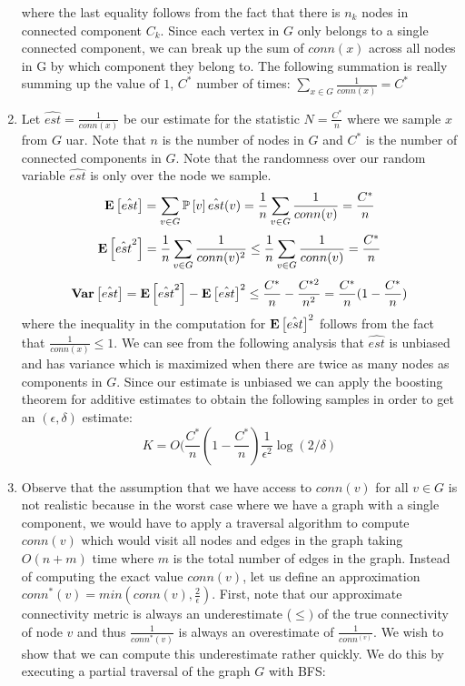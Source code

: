 \documentclass[12pt]{article}
\begin{document}
\begin{solution}
\begin{enumerate}[label=(\alph*)]
    where the last equality follows from the fact that there is $n_k$ nodes in connected component $C_k$. Since each vertex in $G$ only belongs to a single connected component, we can break up the sum of $conn(x)$ across all nodes in G by which component they belong to. The following summation is really summing up the value of $1$, $C^*$ number of times: $\sum_{x\in G}{\frac{1}{conn(x)}} = C^*$
    \item Let $\hat{est} = \frac{1}{conn(x)}$ be our estimate for the statistic $N = \frac{C^*}{n}$ where we sample $x$ from $G$ 
    uar. Note that $n$ is the number of nodes in $G$ and $C^*$ is the number of connected components in $G$. Note that the randomness over our random variable $\hat{est}$ is only over the node we sample. 
    \[
    \mathbf{E}\left[\hat{est}\right] = \sum_{v\in G}{\mathbb{P}\left[v\right]\hat{est}(v)} =  \frac{1}{n}\sum_{v\in G}{\frac{1}{conn(v)}} = \frac{C^*}{n}
    \]
    \[
    \mathbf{E}\left[\hat{est}^2\right] = \frac{1}{n}\sum_{v\in G}{\frac{1}{conn(v)^2}} \leq \frac{1}{n}\sum_{v\in G}{\frac{1}{conn(v)}} = \frac{C^*}{n}
    \]
    \[
    \mathbf{Var}\left[\hat{est}\right] = \mathbf{E}\left[\hat{est}^2\right] - \mathbf{E}\left[\hat{est}\right]^2 \leq \frac{C^*}{n} - \frac{C^{*2}}{n^2} = \frac{C^*}{n} (1 - \frac{C^*}{n})
    \]
    where the inequality in the computation for $\mathbf{E}\left[\hat{est}\right]^2$ follows from the fact that $\frac{1}{conn(x)} \leq 1$. We can see from the following analysis that $\hat{est}$ is unbiased and has variance which is maximized when there are twice as many nodes as components in $G$. Since our estimate is unbiased we can apply the boosting theorem for additive estimates to obtain the following samples in order to get an $(\epsilon,\delta)$ estimate:
    \[
    K = O(\frac{C^*}{n} (1 - \frac{C^*}{n}) \frac{1}{\epsilon^2} \log(2/\delta)
    \]
    \item Observe that the assumption that we have access to $conn(v)$ for all $v\in G$ is not realistic because in the worst case where we have a graph with a single component, we would have to apply a traversal algorithm to compute $conn(v)$ which would visit all nodes and edges in the graph taking $O(n + m)$ time where $m$ is the total number of edges in the graph. Instead of computing the exact value $conn(v)$, let us define an approximation $conn^*(v) = min(conn(v), \frac{2}{\epsilon})$. First, note that our approximate connectivity metric is always an underestimate ($\leq)$ of the true connectivity of node $v$ and thus $\frac{1}{conn^*(v)}$ is always an overestimate of $\frac{1}{conn^(v)}$. We wish to show that we can compute this underestimate rather quickly. We do this by executing a partial traversal of the graph $G$ with BFS:


\end{enumerate}
\end{solution}
\end{document}
